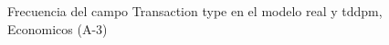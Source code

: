 \begin{figure}[H]
    \centering
    
    \caption{Frecuencia del campo Transaction type en el modelo real y tddpm, Economicos (A-3)}
    \label{frecuency-Transaction Type-tddpm_mlp}
\end{figure}